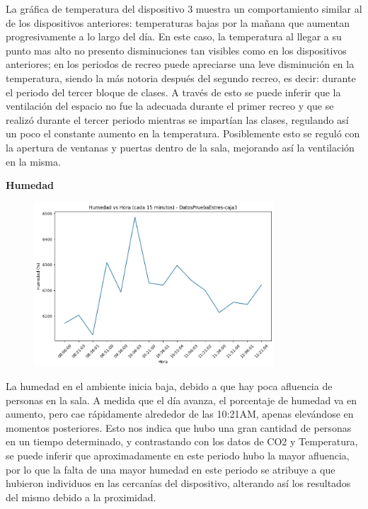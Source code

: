 \documentclass{templateNote}
\begin{document}
\begin{tcolorbox}
    La gráfica de temperatura del dispositivo 3 muestra un comportamiento similar al de los dispositivos anteriores: temperaturas bajas por la mañana que aumentan progresivamente a lo largo del día. En este caso, la temperatura al llegar a su punto mas alto no presento disminuciones tan visibles como en los dispositivos anteriores; en los periodos de recreo puede apreciarse una leve disminución en la temperatura, siendo la más notoria después del segundo recreo, es decir: durante el periodo del tercer bloque de clases. A través de esto se puede inferir que la ventilación del espacio no fue la adecuada durante el primer recreo y que se realizó durante el tercer periodo mientras se impartían las clases, regulando así un poco el constante aumento en la temperatura. Posiblemente esto se reguló con la apertura de ventanas y puertas dentro de la sala, mejorando así la ventilación en la misma.
\end{tcolorbox}

\newpage
\textbf{Humedad}
\begin{figure}[H]
    \centering
    \includegraphics[width=0.8\textwidth]{img/DatosPruebaEstres-caja3_humedad_vs_hora_15min.jpg}
\end{figure}

\begin{tcolorbox}
    La humedad en el ambiente inicia baja, debido a que hay poca afluencia de personas en la sala. A medida que el día avanza, el porcentaje de humedad va en aumento, pero cae rápidamente alrededor de las 10:21AM, apenas elevándose en momentos posteriores. Esto nos indica que hubo una gran cantidad de personas en un tiempo determinado, y contrastando con los datos de CO2 y Temperatura, se puede inferir que aproximadamente en este periodo hubo la mayor afluencia, por lo que la falta de una mayor humedad en este periodo se atribuye a que hubieron individuos en las cercanías del dispositivo, alterando así los resultados del mismo debido a la proximidad.
\end{tcolorbox}
\end{document}
